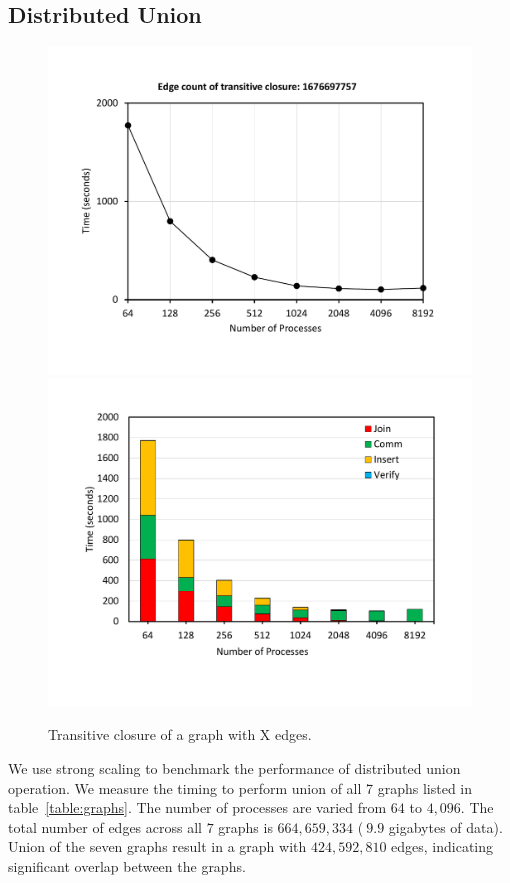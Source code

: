 \subsection{Distributed Union}
\label{sec:union}

\begin{figure}[t]
	{\includegraphics[width=.50\textwidth,  trim={0cm 0cm 0cm 0cm, 
			clip}]{results/TC_1_6Billion.pdf}}\hfill%
	{\includegraphics[width=.50\textwidth,  trim={0cm 0cm 0cm 0cm,
			clip}]{results/TC_1_6Billion_breakdown.pdf}}\hfill%
	\centering
	\caption{Transitive closure of a graph with X edges.}
	\label{fig:tc_small}
\end{figure}

We use strong scaling to benchmark the performance of distributed union operation. We measure the timing to perform union of all 7 graphs listed in table~\ref{table:graphs}. The number of processes are varied from $64$ to $4,096$. The total number of edges across all $7$ graphs is $664,659,334$ ($~9.9$ gigabytes of data). Union of the seven graphs result in a graph with $424,592,810$ edges, indicating significant overlap between the graphs.

